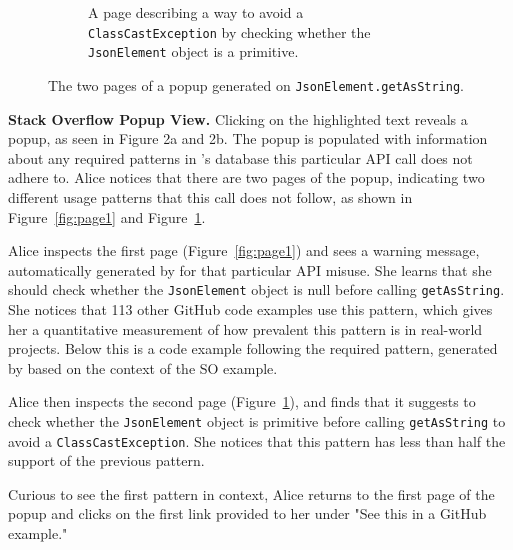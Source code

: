 \begin{figure}
\begin{subfigure}[b]{0.48\textwidth}
  \caption{A page describing a way to avoid a {\tt ClassCastException} by checking whether the {\tt JsonElement} object is a primitive.}
  \vspace{.1in}
  \label{fig:page2}
  \end{subfigure}
  \hfill
\caption{The two pages of a popup generated on {\tt JsonElement.getAsString}.}
\label{fig:features}
\end{figure}


{\bf Stack Overflow Popup View.}
Clicking on the highlighted text reveals a popup, as seen in Figure 2a and 2b. The popup is populated with information about any required patterns in {\soa}'s database this particular API call does not adhere to. Alice notices that there are two pages of the popup, indicating two different usage patterns that this call does not follow, as shown in Figure~\ref{fig:page1} and Figure~\ref{fig:page2}. 

Alice inspects the first page (Figure~\ref{fig:page1}) and sees a warning message, automatically generated by {\soa} for that particular API misuse. She learns that she should check whether the {\tt JsonElement} object is null before calling {\tt getAsString}. She notices that 113 other GitHub code examples use this pattern, which gives her a quantitative measurement of how prevalent this pattern is in real-world projects. Below this is a code example following the required pattern, generated by {\soa} based on the context of the SO example.

Alice then inspects the second page (Figure~\ref{fig:page2}), and finds that it suggests to check whether the {\tt JsonElement} object is primitive before calling {\tt getAsString} to avoid a {\tt ClassCastException}. She notices that this pattern has less than half the support of the previous pattern.

Curious to see the first pattern in context, Alice returns to the first page of the popup and clicks on the first link provided to her under "See this in a GitHub example."

